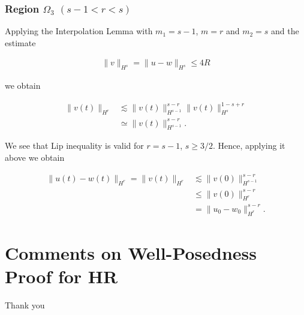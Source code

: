 \documentclass{beamer}
\numberwithin{equation}{section}
\begin{document}
\begin{frame}
\frametitle{Region $\Omega_{3}$ $(s-1 < r < s)$} 


Applying the Interpolation Lemma with $m_{1} = s-1$, $m =r$ and $m_{2} = s$ and
the estimate


\begin{equation*}
\begin{split}
  \|v\|_{H^{s}} = \|u - w \|_{H^{s}} \le 4R
\end{split}
\end{equation*}


we obtain


\begin{equation*}
  \label{pre-lip-ap}
\begin{split}
  \| v(t) \|_{H^{r}} & \lesssim \| v(t) \|_{H^{s-1}}^{s-r} \|v(t) \|_{H^{s}}^{1-s+r}
  \\
  & \simeq \| v(t) \|_{H^{s-1}}^{s-r}.
\end{split}
\end{equation*}


\end{frame}
\begin{frame}
We see that Lip inequality is valid for  $r = s-1$, $s \ge 3/2$. Hence,
applying it above we obtain 


\begin{equation*}
\begin{split}
    \|u(t) - w(t) \|_{H^{r}} = \| v(t) \|_{H^{r}} & \lesssim \|v(0) \|_{H^{s-1}}^{s-r}
   \\
   & \le \|v(0) \|_{H^{r}}^{s-r} 
  \\
  & = \|u_{0} - w_{0}\|_{H^{r}}^{s-r}.
\end{split}
\end{equation*}

\end{frame}
\section{Comments on Well-Posedness Proof for HR}
\begin{frame}
  \begin{center}
  \Large 
    Thank you
  \end{center}
\end{frame}
\end{document}
